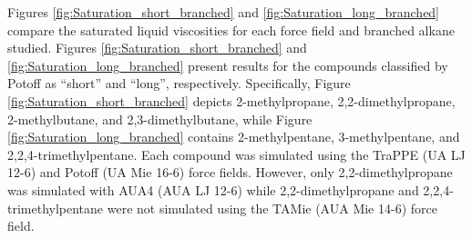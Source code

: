 \documentclass[preprint,review,12pt]{elsarticle}
\begin{document}
	
	Figures \ref{fig:Saturation_short_branched} and \ref{fig:Saturation_long_branched} compare the saturated liquid viscosities for each force field and branched alkane studied. Figures \ref{fig:Saturation_short_branched} and \ref{fig:Saturation_long_branched} present results for the compounds classified by Potoff as ``short'' and ``long'', respectively. Specifically, Figure \ref{fig:Saturation_short_branched} depicts 2-methylpropane, 2,2-dimethylpropane, 2-methylbutane, and 2,3-dimethylbutane, while Figure \ref{fig:Saturation_long_branched} contains 2-methylpentane, 3-methylpentane, and 2,2,4-trimethylpentane. Each compound was simulated using the TraPPE (UA LJ 12-6) and Potoff (UA Mie 16-6) force fields. However, only 2,2-dimethylpropane was simulated with AUA4 (AUA LJ 12-6) while 2,2-dimethylpropane and 2,2,4-trimethylpentane were not simulated using the TAMie (AUA Mie 14-6) force field.
	
	
\end{document}
